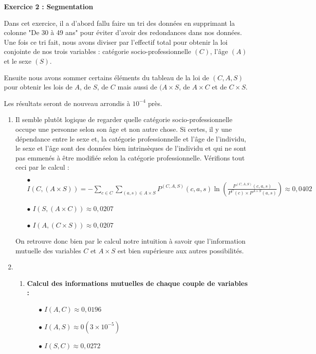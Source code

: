 \documentclass{article}
\begin{document}
\newpage

\textbf{Exercice 2 : Segmentation}

Dans cet exercice, il a d'abord fallu faire un tri des données en supprimant la colonne "De 30 à 49 ans" pour éviter d'avoir des redondances dans nos données. Une fois ce tri fait, nous avons diviser par l'effectif total pour obtenir la loi conjointe de nos trois variables : catégorie socio-professionnelle $(C)$, l'âge $(A)$ et le sexe $(S)$.

Ensuite nous avons sommer certains éléments du tableau de la loi de $(C,A,S)$ pour obtenir les lois de $A$, de $S$, de $C$ mais aussi de $(A\times S$, de $A\times C$ et de $C\times S$.

Les résultats seront de nouveau arrondis à $10^{-4}$ près.

\begin{enumerate}
\item Il semble plutôt logique de regarder quelle catégorie socio-professionnelle occupe une personne selon son âge et non autre chose. Si certes, il y une dépendance entre le sexe et, la catégorie professionnelle et l'âge de l'individu, le sexe et l'âge sont des données bien intrinsèques de l'individu et qui ne sont pas emmenés à être modifiée selon la catégorie professionnelle. Vérifions tout ceci par le calcul : 

\begin{itemize}
\item[$\bullet$] $ \displaystyle I\left(C, (A\times S) \right) = -\sum_{c\in C} \sum_{(a,s)\in A\times S} P^{(C,A,S)}(c,a,s)\ln\left(\frac{P^{(C,A,S)}(c,a,s)}{P^{C}(c)\times P^{A\times S}(a,s)}\right) \approx 0,0402$
\item[$\bullet$] $ \displaystyle I\left(S,(A\times C)\right) \approx 0,0207$

\item[$\bullet$] $ \displaystyle I\left(A,(C\times S)\right) \approx 0,0207$

\end{itemize}

On retrouve donc bien par le calcul notre intuition à savoir que l'information mutuelle des variables $C$ et $A\times S$ est bien supérieure aux autres possibilités.

\item 
	\begin{enumerate}
	\item \textbf{Calcul des informations mutuelles de chaque couple de variables :}
		\begin{itemize}
		\item[$\bullet$] $\displaystyle I(A,C) \approx 0,0196$
		\item[$\bullet$] $\displaystyle I(A,S) \approx 0 (3\times 10^{-5})$
		\item[$\bullet$] $\displaystyle I(S,C) \approx 0,0272$
		\end{itemize}
	

\end{enumerate}
\end{enumerate}
\end{document}
